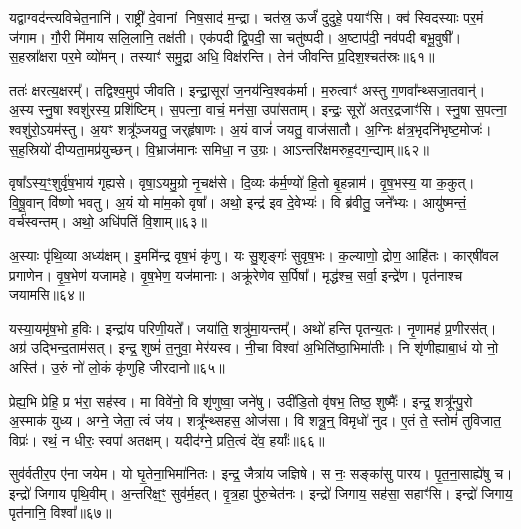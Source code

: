 यद्वाग्वद॑न्त्यविचेत॒नानि॑।
राष्ट्री॑ दे॒वानां निष॒साद॑ म॒न्द्रा।
चत॑स्र॒ ऊर्जं॑ दुदुहे॒ पयाꣳ॑सि।
क्व॑ स्विदस्याः पर॒मं ज॑गाम।
गौ॒री मि॑माय सलि॒लानि॒ तक्ष॑ती।
एक॑पदी द्वि॒पदी॒ सा चतु॑ष्पदी।
अ॒ष्टाप॑दी॒ नव॑पदी बभू॒वुषी᳚।
स॒हस्रा᳚क्षरा पर॒मे व्यो॑मन्।
तस्याꣳ॑ समु॒द्रा अधि॒ विक्ष॑रन्ति।
तेन॑ जीवन्ति प्र॒दिश॒श्चत॑स्रः॥६१॥

ततः॑ क्षरत्य॒क्षरम्᳚।
तद्विश्व॒मुप॑ जीवति।
इन्द्रा॒सूरा॑ ज॒नय॑न्वि॒श्वक॑र्मा।
म॒रुत्वाꣳ॑ अस्तु ग॒णवा᳚न्थ्सजा॒तवान्॑।
अ॒स्य स्नु॒षा श्वशु॑रस्य॒ प्रशि॑ष्टिम्।
स॒पत्ना॒ वाचं॒ मन॑सा॒ उपा॑सताम्।
इन्द्रः॒ सूरो॑ अतर॒द्रजाꣳ॑सि।
स्नु॒षा स॒पत्ना॒ श्वशु॑रो॒\-ऽयम॑स्तु।
अ॒यꣳ शत्रू᳚ञ्जयतु॒ जर्‌\mbox{}हृ॑षाणः।
अ॒यं वाजं॑ जयतु॒ वाज॑सातौ।
अ॒ग्निः क्ष॑त्र॒भृदनि॑भृष्ट॒मोजः॑।
स॒ह॒स्रियो॑ दीप्यता॒मप्र॑युच्छन्।
वि॒भ्राज॑मानः समिधा॒ न उ॒ग्रः।
आऽन्तरि॑क्षमरुह॒दग॒न्द्याम्॥६२॥\anuvakamend[धा॒रय॑न्पुरो॒डाशं॒ बृह॒स्पतिं॑ ज॒घन॑च्युतिमान॒न्दो भग॑स्य तृप्याण्य॒ग्नेः पृ॑थि॒वी यज्व॑न एतु प्र॒दिश॒श्चत॑स्रो॒ वाज॑सातौ च॒त्वारि॑ च]

वृषा᳚\-ऽस्य॒ꣳ॒शुर्वृ॑ष॒भाय॑ गृह्यसे।
वृषा॒\-ऽयमु॒ग्रो नृ॒चक्ष॑से।
दि॒व्यः क॑र्म॒ण्यो॑ हि॒तो बृ॒हन्नाम॑।
वृ॒ष॒भस्य॒ या क॒कुत्।
वि॒षू॒वान् वि॑ष्णो भवतु।
अ॒यं यो मा॑म॒को वृषा᳚।
अथो॒ इन्द्र॑ इव दे॒वेभ्यः॑।
वि ब्र॑वीतु॒ जने᳚भ्यः।
आयु॑ष्मन्तं॒ वर्च॑स्वन्तम्।
अथो॒ अधि॑पतिं वि॒शाम्॥६३॥

अ॒स्याः पृ॑थि॒व्या अध्य॑क्षम्।
इ॒ममि॑न्द्र वृष॒भं कृ॑णु।
यः सु॒शृङ्गः॑ सुवृष॒भः।
क॒ल्याणो॒ द्रोण॒ आहि॑तः।
कार्‌\mbox{}षी॑वल प्रगाणेन।
वृ॒ष॒भेण॑ यजामहे।
वृ॒ष॒भेण॒ यज॑मानाः।
अक्रू॑रेणेव स॒र्पिषा᳚।
मृद्ध॑श्च॒ सर्वा॒ इन्द्रे॑ण।
पृत॑नाश्च जयामसि॥६४॥

यस्या॒यमृ॑ष॒भो ह॒विः।
इन्द्रा॑य परिणी॒यते᳚।
जया॑ति॒ शत्रु॑मा॒यन्तम्᳚।
अथो॑ हन्ति पृतन्य॒तः।
नृ॒णामह॑ प्र॒णीरस॑त्।
अग्र॑ उद्भिन्द॒ताम॑सत्।
इन्द्र॒ शुष्मं॑ त॒नुवा॒ मेर॑यस्व।
नी॒चा विश्वा॑ अ॒भिति॑ष्ठा॒भिमा॑तीः।
नि शृ॑णीह्याबा॒धं यो नो॒ अस्ति॑।
उ॒रुं नो॑ लो॒कं कृ॑णुहि जीरदानो॥६५॥

प्रेह्य॒भि प्रेहि॒ प्र भ॑रा॒ सह॑स्व।
मा विवे॑नो॒ वि शृ॑णुष्वा॒ जने॑षु।
उदी॑डि॒तो वृ॑षभ॒ तिष्ठ॒ शुष्मैः᳚।
इन्द्र॒ शत्रू᳚न्पु॒रो अ॒स्माक॑ युध्य।
अग्ने॒ जेता॒ त्वं ज॑य।
शत्रू᳚न्थ्सहस॒ ओज॑सा।
वि शत्रू॒न्॒ विमृधो॑ नुद।
ए॒तं ते॒ स्तोमं॑ तुविजात॒ विप्रः॑।
रथं॒ न धीरः॒ स्वपा॑ अतक्षम्।
यदीद॑ग्ने॒ प्रति॒त्वं दे॑व॒ हर्याः᳚॥६६॥

सुव॑र्वतीर॒प ए॑ना जयेम।
यो घृ॒तेना॒भिमा॑नितः।
इन्द्र॒ जैत्रा॑य जज्ञिषे।
स नः॒ सङ्का॑सु पारय।
पृ॒त॒ना॒साह्ये॑षु च।
इन्द्रो॑ जिगाय पृथि॒वीम्।
अ॒न्तरि॑क्ष॒ꣳ॒ सुव॑र्म॒हत्।
वृ॒त्र॒हा पु॑रु॒चेत॑नः।
इन्द्रो॑ जिगाय॒ सह॑सा॒ सहाꣳ॑सि।
इन्द्रो॑ जिगाय॒ पृत॑नानि॒ विश्वा᳚॥६७॥

